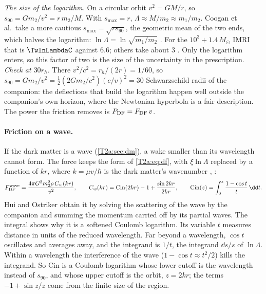 \emph{The size of the logarithm.} On a circular orbit $v^2=GM/r$, so $s_{90}=Gm_2/v^2=r\,m_2/M$. With $s_{\max}=r$, $\Lambda\approx M/m_2\approx m_1/m_2$. Coogan et al.\ take a more cautious $s_{\max}=\sqrt{rs_{90}}$, the geometric mean of the two ends, which halves the logarithm: $\ln\Lambda=\ln\sqrt{m_1/m_2}$ \cite{Coogan2022}. For the $10^3+1.4\,M_\odot$ IMRI that is $\TwlnLambdaC$ against $6.6$; others take about $3$ \cite{Eda2015}. Only the logarithm enters, so this factor of two is the size of the uncertainty in the prescription. \emph{Check at $30r_h$.} There $v^2/c^2=r_h/(2r)=1/60$, so $s_{90}=Gm_2/v^2=\tfrac12(2Gm_2/c^2)(c/v)^2=30$ Schwarzschild radii of the companion: the deflections that build the logarithm happen well outside the companion's own horizon, where the Newtonian hyperbola is a fair description. The power the friction removes is $P_{\rm DF}=F_{\rm DF}\,v$.

\paragraph{Friction on a wave.}
If the dark matter is a wave (\cref{T2a:sec:dm}), a wake smaller than its wavelength cannot form. The force keeps the form of \eqref{T2a:eq:df}, with $\xi\ln\Lambda$ replaced by a function of $kr$, where $k=\mu v/\hbar$ is the dark matter's wavenumber \cite[eq.~(D14)]{HuiOstriker2017}, \cite[eq.~(42)]{Kim2023}:
\begin{equation}
  F_{\rm DF}^{\rm wave}=\frac{4\pi G^2m_2^2\rho\,C_w(kr)}{v^2},\qquad
  C_w(kr)=\mathrm{Cin}(2kr)-1+\frac{\sin2kr}{2kr},\qquad \mathrm{Cin}(z)=\int_0^z\frac{1-\cos t}{t}\,\dd t .
  \label{T2a:eq:df-wave}
\end{equation}
Hui and Ostriker obtain it by solving the scattering of the wave by the companion and summing the momentum carried off by its partial waves. The integral shows why it is a softened Coulomb logarithm. Its variable $t$ measures distance in units of the reduced wavelength. Far beyond a wavelength, $\cos t$ oscillates and averages away, and the integrand is $1/t$, the integrand $\dd s/s$ of $\ln\Lambda$. Within a wavelength the interference of the wave ($1-\cos t\approx t^2/2$) kills the integrand. So Cin is a Coulomb logarithm whose lower cutoff is the wavelength instead of $s_{90}$, and whose upper cutoff is the orbit, $z=2kr$; the terms $-1+\sin z/z$ come from the finite size of the region.

